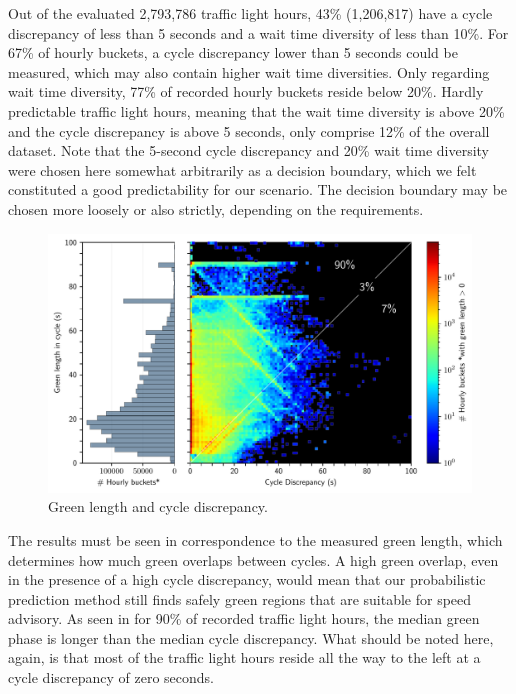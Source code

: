 Out of the evaluated 2,793,786 traffic light hours, 43\% (1,206,817) have a cycle discrepancy of less than 5 seconds and a wait time diversity of less than 10\%. For 67\% of hourly buckets, a cycle discrepancy lower than 5 seconds could be measured, which may also contain higher wait time diversities. Only regarding wait time diversity, 77\% of recorded hourly buckets reside below 20\%. Hardly predictable traffic light hours, meaning that the wait time diversity is above 20\% and the cycle discrepancy is above 5 seconds, only comprise 12\% of the overall dataset. Note that the 5-second cycle discrepancy and 20\% wait time diversity were chosen here somewhat arbitrarily as a decision boundary, which we felt constituted a good predictability for our scenario. The decision boundary may be chosen more loosely or also strictly, depending on the requirements.

\begin{figure}[t]
    \centering
    \includegraphics[width=\linewidth]{images/cycle_discrepancy_green_length_heatmap.pdf}
    \caption{Green length and cycle discrepancy.}\label{fig:green-length-cycle-discrepancy}
\end{figure}

The results must be seen in correspondence to the measured green length, which determines how much green overlaps between cycles. A high green overlap, even in the presence of a high cycle discrepancy, would mean that our probabilistic prediction method still finds safely green regions that are suitable for speed advisory. As seen in  for 90\% of recorded traffic light hours, the median green phase is longer than the median cycle discrepancy. What should be noted here, again, is that most of the traffic light hours reside all the way to the left at a cycle discrepancy of zero seconds.

